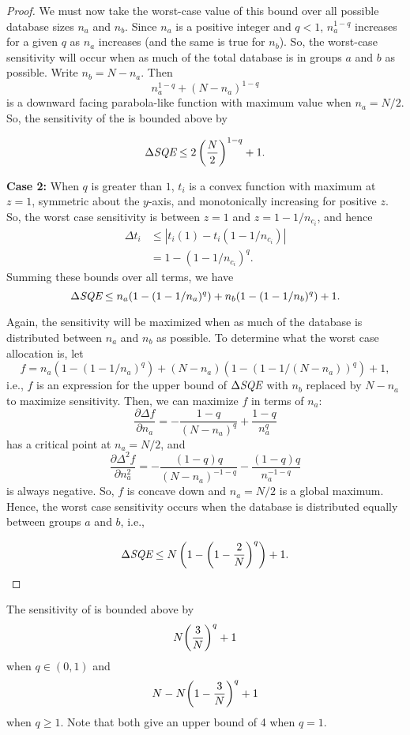 \begin{proof}
We must now take the worst-case value of this bound over all possible database sizes $n_a$ and $n_b$.  Since $n_a$ is a positive integer and $q<1$, $n_a^{1-q}$ increases for a given $q$ as $n_a$ increases (and the same is true for $n_b$). So, the worst-case sensitivity will occur when as much of the total database is in groups $a$ and $b$ as possible. Write $n_b = N-n_a$. Then
$$n_a^{1-q} + (N-n_a)^{1-q}$$
is a downward facing parabola-like function with maximum value when $n_a = N/2$. So, the sensitivity of the \sqe is bounded above by

$$\Delta \textit{SQE} \le 2\left(\frac{N}{2}\right)^{1-q} + 1.$$

\noindent\textbf{Case 2:}
When $q$ is greater than $1$, $t_{i}$ is a convex function with maximum at $z=1$, symmetric about the $y$-axis, and monotonically increasing for positive $z$. So, the worst case sensitivity is between $z=1$ and $z=1-1/n_{c_i}$, and hence 
%
\begin{align*}
\Delta t_{i} &\le \left\vert t_{i}(1) - t_{i}(1-1/n_{c_i}) \right\vert \\
	&= 1 - (1-1/n_{c_i})^q.
\end{align*}
%
Summing these bounds over all terms, we have 
%
$$ \Delta\textit{SQE} \le n_a(1-(1-1/n_a)^q) + n_b(1-(1-1/n_b)^q) + 1.$$

Again, the sensitivity will be maximized when as much of the database is distributed between $n_a$ and $n_b$ as possible. To determine what the worst case allocation is, let 
$$f = n_a(1-(1-1/n_a)^q) + (N-n_a)(1-(1-1/(N-n_a))^q) + 1,$$
i.e., $f$ is an expression for the upper bound of $\Delta\textit{SQE}$ with $n_b$ replaced by $N-n_a$ to maximize sensitivity. Then, we can maximize $f$ in terms of $n_a$:
$$ \frac{\partial \Delta f}{\partial n_a} =  -\frac{1-q}{(N - n_a)^q} + \frac{1-q}{n_a^q}$$
has a critical point at $n_a = N/2$, and 
$$ \frac{\partial \Delta^2 f}{\partial n_a^2} = - \frac{(1-q)q}{(N-n_a)^{-1-q}} - \frac{(1-q)q}{n_a^{-1-q}}$$
is always negative. So, $f$ is concave down and $n_a = N/2$ is a global maximum. Hence, the worst case sensitivity occurs when the database is distributed equally between groups $a$ and $b$, i.e.,

$$ \Delta\textit{SQE} \le N \left( 1- \left(1-\frac{2}{N}\right)^q \right) + 1.$$
\end{proof}

\setcounter{theorem}{7}
\begin{theorem} \label{thm:SQAsens-appendix} The sensitivity of \sqa is bounded above by 
\begin{equation*}
N\bigg(\frac{3}{N}\bigg)^q + 1
\end{equation*}
when $q \in (0,1)$ and
\begin{equation*}
N-N\bigg(1-\frac{3}{N}\bigg)^q + 1
\end{equation*}
when $q \geq 1$. Note that both give an upper bound of 4 when $q = 1$.
\end{theorem}

